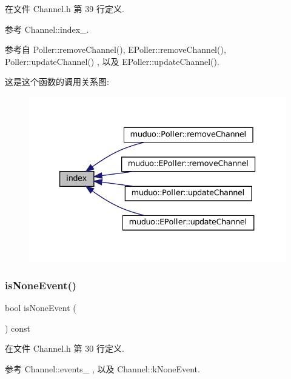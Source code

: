 在文件 Channel.\+h 第 39 行定义.



参考 Channel\+::index\+\_\+.



参考自 Poller\+::remove\+Channel(), E\+Poller\+::remove\+Channel(), Poller\+::update\+Channel() , 以及 E\+Poller\+::update\+Channel().

这是这个函数的调用关系图\+:
\nopagebreak
\begin{figure}[H]
\begin{center}
\leavevmode
\includegraphics[width=333pt]{classmuduo_1_1Channel_a019749328da42c4814af71d3e3b647ad_icgraph}
\end{center}
\end{figure}
\mbox{\label{classmuduo_1_1Channel_af586af8cbcc49b563969f6c8356b3c9a}} 
\subsubsection{\texorpdfstring{is\+None\+Event()}{isNoneEvent()}}
{\footnotesize\ttfamily bool is\+None\+Event (\begin{DoxyParamCaption}{ }\end{DoxyParamCaption}) const\hspace{0.3cm}{\ttfamily [inline]}}



在文件 Channel.\+h 第 30 行定义.



参考 Channel\+::events\+\_\+ , 以及 Channel\+::k\+None\+Event.



